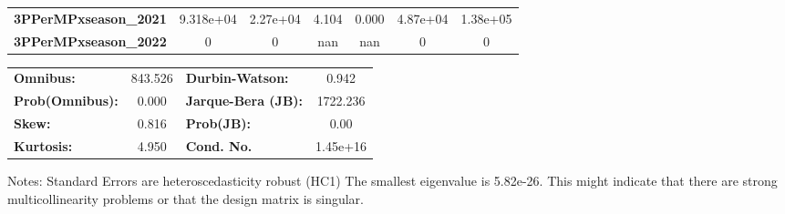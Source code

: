 \begin{center}
\begin{tabular}{lcccccc}
\textbf{3PPerMPxseason\_2021} &    9.318e+04  &     2.27e+04     &     4.104  &         0.000        &     4.87e+04    &     1.38e+05     \\
\textbf{3PPerMPxseason\_2022} &            0  &            0     &       nan  &           nan        &            0    &            0     \\
\bottomrule
\end{tabular}
\begin{tabular}{lclc}
\textbf{Omnibus:}       & 843.526 & \textbf{  Durbin-Watson:     } &    0.942  \\
\textbf{Prob(Omnibus):} &   0.000 & \textbf{  Jarque-Bera (JB):  } & 1722.236  \\
\textbf{Skew:}          &   0.816 & \textbf{  Prob(JB):          } &     0.00  \\
\textbf{Kurtosis:}      &   4.950 & \textbf{  Cond. No.          } & 1.45e+16  \\
\bottomrule
\end{tabular}
\end{center}

Notes: \newline
 [1] Standard Errors are heteroscedasticity robust (HC1) \newline
 [2] The smallest eigenvalue is 5.82e-26. This might indicate that there are \newline
 strong multicollinearity problems or that the design matrix is singular.